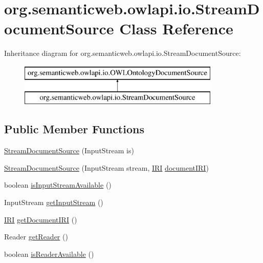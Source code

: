 \hypertarget{classorg_1_1semanticweb_1_1owlapi_1_1io_1_1_stream_document_source}{\section{org.\-semanticweb.\-owlapi.\-io.\-Stream\-Document\-Source Class Reference}
\label{classorg_1_1semanticweb_1_1owlapi_1_1io_1_1_stream_document_source}
}
Inheritance diagram for org.\-semanticweb.\-owlapi.\-io.\-Stream\-Document\-Source\-:\begin{figure}[H]
\begin{center}
\leavevmode
\includegraphics[height=2.000000cm]{classorg_1_1semanticweb_1_1owlapi_1_1io_1_1_stream_document_source}
\end{center}
\end{figure}
\subsection*{Public Member Functions}
\begin{DoxyCompactItemize}
\item 
\hyperlink{classorg_1_1semanticweb_1_1owlapi_1_1io_1_1_stream_document_source_a40896abcdb8ec0e10ef7bba2cc40c960}{Stream\-Document\-Source} (Input\-Stream is)
\item 
\hyperlink{classorg_1_1semanticweb_1_1owlapi_1_1io_1_1_stream_document_source_a566d87461ca73c8b7b27c653f26fa353}{Stream\-Document\-Source} (Input\-Stream stream, \hyperlink{classorg_1_1semanticweb_1_1owlapi_1_1model_1_1_i_r_i}{I\-R\-I} \hyperlink{classorg_1_1semanticweb_1_1owlapi_1_1io_1_1_stream_document_source_a86e12cbfa2b87e56537fe5b28d100eb0}{document\-I\-R\-I})
\item 
boolean \hyperlink{classorg_1_1semanticweb_1_1owlapi_1_1io_1_1_stream_document_source_af03dc7d4584788effe17afaa56d21e1a}{is\-Input\-Stream\-Available} ()
\item 
Input\-Stream \hyperlink{classorg_1_1semanticweb_1_1owlapi_1_1io_1_1_stream_document_source_a27d4c73a6473c7553386bb526861cc2d}{get\-Input\-Stream} ()
\item 
\hyperlink{classorg_1_1semanticweb_1_1owlapi_1_1model_1_1_i_r_i}{I\-R\-I} \hyperlink{classorg_1_1semanticweb_1_1owlapi_1_1io_1_1_stream_document_source_a78a9bdffeb1e067250008bf88c2200a0}{get\-Document\-I\-R\-I} ()
\item 
Reader \hyperlink{classorg_1_1semanticweb_1_1owlapi_1_1io_1_1_stream_document_source_a69bf4f757d5e8c9ee3f86cd20932ae1b}{get\-Reader} ()
\item 
boolean \hyperlink{classorg_1_1semanticweb_1_1owlapi_1_1io_1_1_stream_document_source_ad40633b7f3a6809c8f83ee7bed79d772}{is\-Reader\-Available} ()
\end{DoxyCompactItemize}
